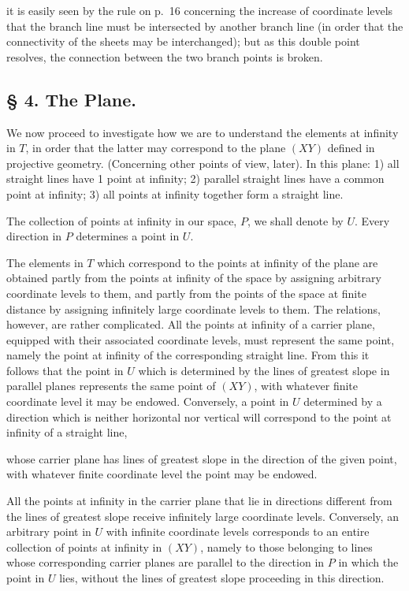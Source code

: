 \documentclass{article}
\begin{document}
it is easily seen by the rule on p.~16 concerning the increase of coordinate levels that the branch line must be intersected by another branch line (in order that the connectivity of the sheets may be interchanged); but as this double point resolves, the connection between the two branch points is broken.

\subsection*{§ 4. The Plane.}

We now proceed to investigate how we are to understand the elements at infinity in $T$, in order that the latter may correspond to the plane $(XY)$ defined in projective geometry. (Concerning other points of view, later). In this plane:
1) all straight lines have 1 point at infinity;
2) parallel straight lines have a common point at infinity;
3) all points at infinity together form a straight line.

The collection of points at infinity in our space, $P$, we shall denote by $U$. Every direction in $P$ determines a point in $U$.

The elements in $T$ which correspond to the points at infinity of the plane are obtained partly from the points at infinity of the space by assigning arbitrary coordinate levels to them, and partly from the points of the space at finite distance by assigning infinitely large coordinate levels to them. The relations, however, are rather complicated. All the points at infinity of a carrier plane, equipped with their associated coordinate levels, must represent the same point, namely the point at infinity of the corresponding straight line. From this it follows that the point in $U$ which is determined by the lines of greatest slope in parallel planes represents the same point of $(XY)$, with whatever finite coordinate level it may be endowed. Conversely, a point in $U$ determined by a direction which is neither horizontal nor vertical will correspond to the point at infinity of a straight line,

whose carrier plane has lines of greatest slope in the direction of the given point, with whatever finite coordinate level the point may be endowed.

All the points at infinity in the carrier plane that lie in directions different from the lines of greatest slope receive infinitely large coordinate levels. Conversely, an arbitrary point in $U$ with infinite coordinate levels corresponds to an entire collection of points at infinity in $(XY)$, namely to those belonging to lines whose corresponding carrier planes are parallel to the direction in $P$ in which the point in $U$ lies, without the lines of greatest slope proceeding in this direction.
\end{document}
